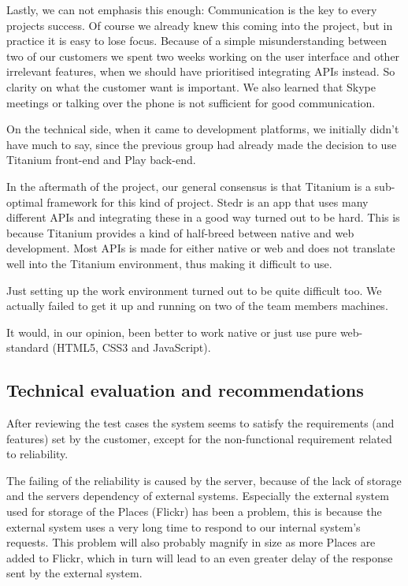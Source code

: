 Lastly, we can not emphasis this enough: Communication is the key to every projects success. Of course we already knew this coming into the project, but in practice it is easy to lose focus. Because of a simple misunderstanding between two of our customers we spent two weeks working on the user interface and other irrelevant features, when we should have prioritised integrating APIs instead. So clarity on what the customer want is important. We also learned that Skype meetings or talking over the phone is not sufficient for good communication.

On the technical side, when it came to development platforms, we initially didn't have much to say, since the previous group had already made the decision to use Titanium front-end and Play back-end.

In the aftermath of the project, our general consensus is that Titanium is a sub-optimal framework for this kind of project. Stedr is an app that uses many different APIs and integrating these in a good way turned out to be hard. This is because Titanium provides a kind of half-breed between native and web development. Most APIs is made for either native or web and does not translate well into the Titanium environment, thus making it difficult to use.

Just setting up the work environment turned out to be quite difficult too. We actually failed to get it up and running on two of the team members machines.

It would, in our opinion, been better to work native or just use pure web-standard (HTML5, CSS3 and JavaScript).

	\subsection{Technical evaluation and recommendations}

After reviewing the test cases the system seems to satisfy the requirements (and features) set by the customer, except for the non-functional requirement related to reliability.

The failing of the reliability is caused by the server, because of the lack of storage and the servers dependency of external systems. Especially the external system used for storage of the Places (Flickr) has been a problem, this is because the external system uses a very long time to respond to our internal system's requests. This problem will also probably magnify in size as more Places are added to Flickr, which in turn will lead to an even greater delay of the response sent by the external system.

